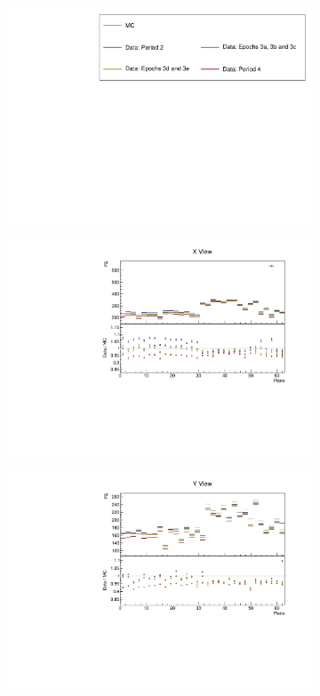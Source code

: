 \documentclass[12pt,a4paper]{article}
\begin{document}
\begin{figure}[!ht]
  \begin{subfigure}{\textwidth}
  \centering
    \includegraphics[height=0.2\linewidth]{essentialsec_tb/legend.pdf}
  \end{subfigure}
  \vspace*{2mm}

  \begin{subfigure}{0.5\textwidth}
    \includegraphics[width=\linewidth]{essentialsec_tb/pe_plane_x.pdf}
  \end{subfigure}
  \begin{subfigure}{0.5\textwidth}
    \includegraphics[width=\linewidth]{essentialsec_tb/pe_plane_y.pdf}

\end{subfigure}
\end{figure}
\end{document}
